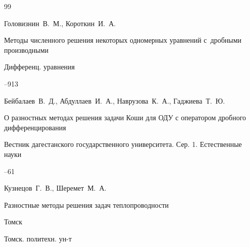 \begin{thebibliography}{99}

\by Головизнин~В.~М., Короткин~И.~А.

\paper Методы численного решения некоторых одномерных уравнений с~дробными производными

\jour Дифференц. уравнения




--913













\by Бейбалаев~В.~Д., Абдуллаев~И.~А., Наврузова~К.~А., Гаджиева~Т.~Ю.

\paper О разностных методах решения задачи Коши для ОДУ с оператором дробного дифференцирования

\jour  Вестник дагестанского государственного университета. Сер. 1. Естественные науки



--61





\by Кузнецов~Г.~В., Шеремет~М.~А.

\book Разностные методы решения задач теплопроводности

\publaddr Томск

\publ Томск. политехн. ун-т





\end{thebibliography}









